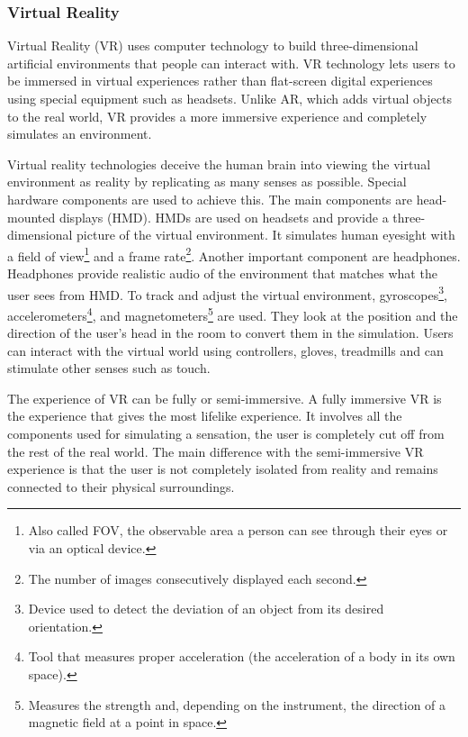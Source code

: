 \documentclass[12pt, a4paper]{article}
\begin{document}
\begin{multicols}{2}
\subsubsection{Virtual Reality}

\par Virtual Reality (VR) uses computer technology to build three-dimensional artificial environments that people can interact with. VR technology lets users to be immersed in virtual experiences rather than flat-screen digital experiences using special equipment such as headsets. Unlike AR, which adds virtual objects to the real world, VR provides a more immersive experience and completely simulates an environment.
\par Virtual reality technologies deceive the human brain into viewing the virtual environment as reality by replicating as many senses as possible. Special hardware components are used to achieve this. The main components are head-mounted displays (HMD). HMDs are used on headsets and provide a three-dimensional picture of the virtual environment. It simulates human eyesight with a field of view\footnote{Also called FOV, the observable area a person can see through their eyes or via an optical device.} and a frame rate\footnote{The number of images consecutively displayed each second.}. Another important component are headphones. Headphones provide realistic audio of the environment that matches what the user sees from HMD. To track and adjust the virtual environment, gyroscopes\footnote{Device used to detect the deviation of an object from its desired orientation.}, accelerometers\footnote{Tool that measures proper acceleration (the acceleration of a body in its own space).}, and magnetometers\footnote{Measures the strength and, depending on the instrument, the direction of a magnetic field at a point in space.} are used. They look at the position and the direction of the user’s head in the room to convert them in the simulation. Users can interact with the virtual world using controllers, gloves, treadmills and can stimulate other senses such as touch.
\par The experience of VR can be fully or semi-immersive. A fully immersive VR is the experience that gives the most lifelike experience. It involves all the components used for simulating a sensation, the user is completely cut off from the rest of the real world. The main difference with the semi-immersive VR experience is that the user is not completely isolated from reality and remains connected to their physical surroundings.\cite{metaverse2}


\end{multicols}
\end{document}
